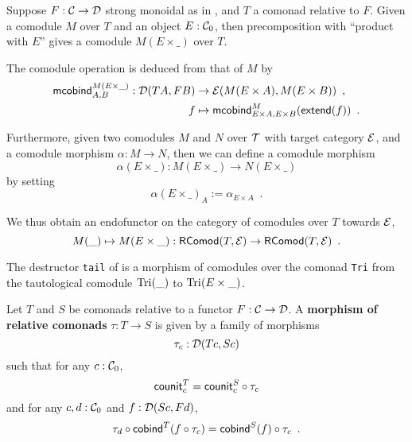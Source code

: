 \documentclass{amsart}
\newcommand{\fat}[1]{\textbf{#1}}
\begin{document}
\begin{definition}\label{def:product_in_context}
 Suppose $F:\C\to\D$ strong monoidal as in , and $T$ a comonad relative to $F$.
 Given a comodule $M$ over $T$ and an object $E:\C_0$, then precomposition with \enquote{product with $E$}
 gives a comodule $M(E\times\_)$ over $T$.
 
 The comodule operation is deduced from that of $M$ by 
 \begin{align*} \mcobind^{M(E\times\_)}_{A,B} : \D(TA,FB)&\to \E(M(E\times A), M(E\times B)) \enspace ,\\
                                                      f &\mapsto \mcobind^M_{E\times A,E\times B}(\extend(f)) \enspace .
  \end{align*}                                        

 \noindent
 Furthermore, given two comodules $M$ and $N$ over $\T$ with target category $\E$, and a comodule morphism $\alpha : M \to N$, then 
 we can define a comodule morphism \[\alpha(E\times \_) : M(E\times \_) \to N(E\times \_) \] by setting
          \[ \alpha(E \times \_)_A := \alpha_{E\times A} \enspace . \]
  
  \noindent
  We thus obtain an endofunctor on the category of comodules over $T$ towards $\E$,
   \[ M(\_) \mapsto  M (E\times \_) : \RComod(T,\E) \to \RComod(T,\E) \enspace . \]
 

\end{definition}

% 
%   
% 
%  
%  





\begin{example}\label{ex:tail_comodule}
 The destructor \lstinline!tail! of  is a morphism of comodules over the comonad \lstinline!Tri! 
  from the tautological comodule  $\text{\lstinline!Tri!}(\_)$ to $\text{\lstinline!Tri!}(E\times \_)$.
\end{example}


\begin{definition}
 Let $T$ and $S$ be comonads relative to a functor $F : \C \to \D$. A \fat{morphism of relative comonads} $\tau : T \to S$
  is given by a family of morphisms \[\tau_c : \D(Tc,Sc)\] such that for any $c : \C_0$,
     \[  \counit^T_c = \comp{\tau_c}{\counit^S_c} \]
   and for any $c,d : \C_0$ and $f : \D(Sc,Fd)$,
   \[  \comp{\cobind^T(\comp{\tau_c}{f})}{\tau_d} = \comp{\tau_c}{\cobind^S(f)} \enspace .  \]
\end{definition}
\end{document}
